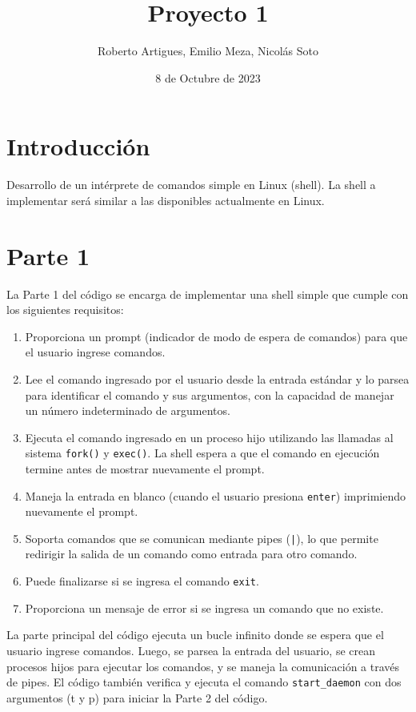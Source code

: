 \documentclass[12pt]{article}
\begin{document}
\title{Proyecto 1}
\author{Roberto Artigues, Emilio Meza, Nicolás Soto}
\date{8 de Octubre de 2023}
\maketitle


\section{Introducción}
Desarrollo de un intérprete de comandos simple en Linux (shell). La shell a implementar será similar
a las disponibles actualmente en Linux.
\section{Parte 1}

La Parte 1 del código se encarga de implementar una shell simple que cumple con los siguientes requisitos:

\begin{enumerate}
\item Proporciona un prompt (indicador de modo de espera de comandos) para que el usuario ingrese comandos.
\item Lee el comando ingresado por el usuario desde la entrada estándar y lo parsea para identificar el comando y sus argumentos, con la capacidad de manejar un número indeterminado de argumentos.
\item Ejecuta el comando ingresado en un proceso hijo utilizando las llamadas al sistema \texttt{fork()} y \texttt{exec()}. La shell espera a que el comando en ejecución termine antes de mostrar nuevamente el prompt.
\item Maneja la entrada en blanco (cuando el usuario presiona \texttt{enter}) imprimiendo nuevamente el prompt.
\item Soporta comandos que se comunican mediante pipes (\texttt{|}), lo que permite redirigir la salida de un comando como entrada para otro comando.
\item Puede finalizarse si se ingresa el comando \texttt{exit}.
\item Proporciona un mensaje de error si se ingresa un comando que no existe.
\end{enumerate}

La parte principal del código ejecuta un bucle infinito donde se espera que el usuario ingrese comandos. Luego, se parsea la entrada del usuario, se crean procesos hijos para ejecutar los comandos, y se maneja la comunicación a través de pipes. El código también verifica y ejecuta el comando \texttt{start\_daemon} con dos argumentos (t y p) para iniciar la Parte 2 del código.
\end{document}
